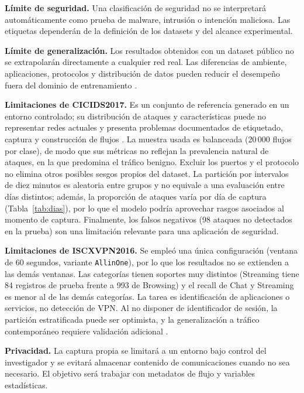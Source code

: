 \documentclass[conference]{IEEEtran}
\begin{document}
\textbf{Límite de seguridad.} Una clasificación de seguridad no se interpretará automáticamente como prueba de malware, intrusión o intención maliciosa. Las etiquetas dependerán de la definición de los datasets y del alcance experimental.

\textbf{Límite de generalización.} Los resultados obtenidos con un dataset público no se extrapolarán directamente a cualquier red real. Las diferencias de ambiente, aplicaciones, protocolos y distribución de datos pueden reducir el desempeño fuera del dominio de entrenamiento \cite{shen2023,liang2024,pathmaperuma2022,arp2022}.

\textbf{Limitaciones de CICIDS2017.} Es un conjunto de referencia generado en un entorno controlado; su distribución de ataques y características puede no representar redes actuales y presenta problemas documentados de etiquetado, captura y construcción de flujos \cite{engelen2021,lanvin2022,rosay2022,ring2019}. La muestra usada es balanceada (20\,000 flujos por clase), de modo que sus métricas no reflejan la prevalencia natural de ataques, en la que predomina el tráfico benigno. Excluir los puertos y el protocolo no elimina otros posibles sesgos propios del dataset. La partición por intervalos de diez minutos es aleatoria entre grupos y no equivale a una evaluación entre días distintos; además, la proporción de ataques varía por día de captura (Tabla~\ref{tab:dias}), por lo que el modelo podría aprovechar rasgos asociados al momento de captura. Finalmente, los falsos negativos (98 ataques no detectados en la prueba) son una limitación relevante para una aplicación de seguridad.

\textbf{Limitaciones de ISCXVPN2016.} Se empleó una única configuración (ventana de 60 segundos, variante \texttt{AllinOne}), por lo que los resultados no se extienden a las demás ventanas. Las categorías tienen soportes muy distintos (Streaming tiene 84 registros de prueba frente a 993 de Browsing) y el recall de Chat y Streaming es menor al de las demás categorías. La tarea es identificación de aplicaciones o servicios, no detección de VPN. Al no disponer de identificador de sesión, la partición estratificada puede ser optimista, y la generalización a tráfico contemporáneo requiere validación adicional \cite{arp2022,drapergil2016}.

\textbf{Privacidad.} La captura propia se limitará a un entorno bajo control del investigador y se evitará almacenar contenido de comunicaciones cuando no sea necesario. El objetivo será trabajar con metadatos de flujo y variables estadísticas.
\end{document}
